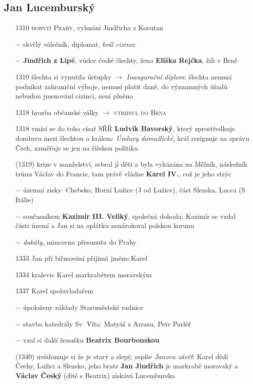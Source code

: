 \documentclass{article}
\begin{document}
\subsection*{Jan Lucemburský}
\begin{itemize}
    \vspace{-0.5em}
    \setlength\itemsep{0.15em}
    \item[1310] \textsc{dobytí Prahy}, vyhnání Jindřicha z Korutan
    \item[$-$] skvělý válečník, diplomat, \textit{král cizinec}
    \item[$-$] \textbf{Jindřich z Lipé}, vůdce české člechty, žena \textbf{Eliška Rejčka}, žili v Brně
    \item[1310] šlechta si vynutila ústupky $\rightarrow$ \textit{Inaugurační diplom}: šlechta nemusí podnikat zahraniční výboje, nemusí platit daně, do významných úřadů nebudou jmenování cizinci, není plněno
    \item[1318] hrozba občanské války $\rightarrow$ \textsc{vtrhnul do Brna}
    \item[1318] vmísí se do toho císař SŘŘ \textbf{Ludvík Bavorský}, který zprostředkuje domluvu mezi šlechtou a králem: \textit{Úmluvy domažlické}, král rezignuje na správu Čech, zaměřuje se jen na říšskou politiku
    \item[(1319)] krize v manželství, sebral jí děti a byla vykázána na Mělník, následník trůnu Václav do Francie, tam právě vládne \textbf{Karel IV.}, což je jeho strýc
    \item[$-$] územní zisky: Chebsko, Horní Lužice (J od Lužice), část Slezska, Lucca (S Itálie)
    \item[$-$] současníkem \textbf{Kazimír III. Veliký}, společná dohoda: Kazimír se vzdal části území a Jan si na oplátku nenárokoval polskou korunu
    \item[$-$] \textit{dukáty}, mincovna přesunuta do Prahy
    \item[1333] Jan při biřmování přijímá jméno Karel
    \item[1334] kralevic Karel markrabětem moravským
    \item[1337] Karel spoluvladařem
    \item[$-$] úpoloženy základy Staroměstské radnice
    \item[$-$] stavba katedrály Sv. Víta: Matyáš z Arrasu, Petr Parléř
    \item[$-$] vzal si další ženušku \textbf{Beatrix Bourbonskou}
    \item[(1340)] uvědomuje si že je starý a slepý, sepíše \textit{Janovu závěť}: Karel dědí Čechy, Lužici a Slezsko, jeho bratr \textbf{Jan Jindřich} je markrabě moravský a \textbf{Václav Český} (dítě s Beatrix) získává Lucembursko

\end{itemize}
\end{document}
